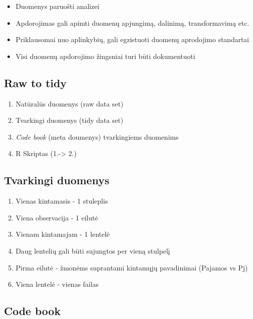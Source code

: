 \documentclass[]{article}
\providecommand{\tightlist}{%
  \setlength{\itemsep}{0pt}\setlength{\parskip}{0pt}}
\begin{document}
\begin{itemize}
\tightlist
\item
  Duomenys paruošti analizei
\item
  Apdorojimas gali apimti duomenų apjungimą, dalinimą, transformavimą
  etc.
\item
  Priklausomai nuo aplinkybių, gali egzistuoti duomenų aprodojimo
  standartai
\item
  Visi duomenų apdorojimo žingsniai turi būti dokumentuoti
\end{itemize}

\subsection{Raw to tidy}\label{raw-to-tidy}

\begin{enumerate}
\def\labelenumi{\arabic{enumi}.}
\tightlist
\item
  Natūralūs duomenys (raw data set)
\item
  Tvarkingi duomenys (tidy data set)
\item
  \emph{Code book} (meta doumenys) tvarkingiems duomenims
\item
  R Skriptas (1.-\textgreater{} 2.)
\end{enumerate}

\subsection{Tvarkingi duomenys}\label{tvarkingi-duomenys}

\begin{enumerate}
\def\labelenumi{\arabic{enumi}.}
\tightlist
\item
  Vienas kintamasis - 1 stuleplis
\item
  Viena observacija - 1 eilutė
\item
  Vienam kintamajam - 1 lentelė
\item
  Daug lentelių gali būti sujungtos per vieną stulpelį
\item
  Pirma eilutė - žmonėms suprantami kintamųjų pavadinimai (Pajamos vs
  Pj)
\item
  Viena lentelė - vienas failas
\end{enumerate}

\subsection{Code book}\label{code-book}
\end{document}
